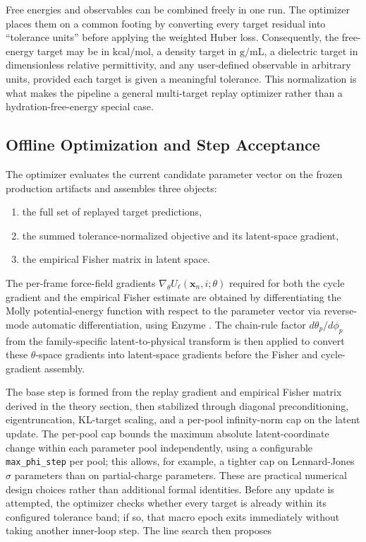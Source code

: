 Free energies and observables can be combined freely in one run. The optimizer
places them on a common footing by converting every target residual into
``tolerance units'' before applying the weighted Huber loss. Consequently, the
free-energy target may be in \(\mathrm{kcal/mol}\), a density target in
\(\mathrm{g/mL}\), a dielectric target in dimensionless relative permittivity,
and any user-defined observable in arbitrary units, provided each target is
given a meaningful tolerance. This normalization is what makes the pipeline a
general multi-target replay optimizer rather than a hydration-free-energy
special case.

\subsection{Offline Optimization and Step Acceptance}

The optimizer evaluates the current candidate parameter vector on the frozen production artifacts and assembles three objects:

\begin{enumerate}
    \item the full set of replayed target predictions,
    \item the summed tolerance-normalized objective and its latent-space gradient,
    \item the empirical Fisher matrix in latent space.
\end{enumerate}

The per-frame force-field gradients $\nabla_\theta U_\ell(\mathbf{x}_n, i; \theta)$ required for both the cycle gradient and the empirical Fisher estimate are obtained by differentiating the Molly potential-energy function with respect to the parameter vector via reverse-mode automatic differentiation, using Enzyme \citep{moses2020enzyme}. The chain-rule factor $d\theta_p/d\phi_p$ from the family-specific latent-to-physical transform is then applied to convert these $\theta$-space gradients into latent-space gradients before the Fisher and cycle-gradient assembly.

The base step is formed from the replay gradient and empirical Fisher matrix derived in the theory section, then stabilized through diagonal preconditioning, eigentruncation, KL-target scaling, and a per-pool infinity-norm cap on the latent update. The per-pool cap bounds the maximum absolute latent-coordinate change within each parameter pool independently, using a configurable \texttt{max\_phi\_step} per pool; this allows, for example, a tighter cap on Lennard-Jones $\sigma$ parameters than on partial-charge parameters. These are practical numerical design choices rather than additional formal identities. Before any update is attempted, the optimizer checks whether every target is already within its configured tolerance band; if so, that macro epoch exits immediately without taking another inner-loop step. The line search then proposes

